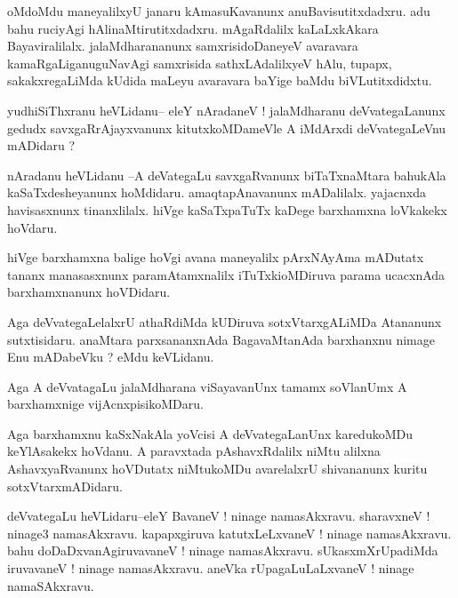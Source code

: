 \documentclass{article}
\begin{document}
\begin{mn}%
oMdoMdu maneyalilxyU janaru kAmasuKavanunx anuBavisutitxdadxru. adu bahu ruciyAgi 
hAlinaMtirutitxdadxru. mAgaRdalilx kaLaLxkAkara Bayaviralilalx. jalaMdharananunx 
samxrisidoDaneyeV avaravara kamaRgaLiganuguNavAgi samxrisida sathxLAdalilxyeV hAlu, tupapx, 
sakakxregaLiMda kUdida maLeyu avaravara baYige baMdu biVLutitxdidxtu.
\end{mn}

 
\begin{mn}%
yudhiSiThxranu heVLidanu-- eleY nAradaneV ! jalaMdharanu deVvategaLanunx gedudx 
savxgaRrAjayxvanunx kitutxkoMDameVle A iMdArxdi deVvategaLeVnu mADidaru ?
\end{mn}

\begin{mn}%
nAradanu heVLidanu --A deVategaLu savxgaRvanunx biTaTxnaMtara bahukAla kaSaTxdesheyanunx 
hoMdidaru. amaqtapAnavanunx mADalilalx. yajacnxda havisasxnunx tinanxlilalx. hiVge 
kaSaTxpaTuTx kaDege barxhamxna loVkakekx hoVdaru.
\end{mn}

\begin{mn}%
hiVge barxhamxna balige hoVgi avana maneyalilx pArxNAyAma mADutatx tananx manasasxnunx 
paramAtamxnalilx iTuTxkioMDiruva parama ucacxnAda barxhamxnanunx hoVDidaru.
\end{mn}

\begin{mn}%
Aga deVvategaLelalxrU athaRdiMda kUDiruva sotxVtarxgALiMDa Atananunx sutxtisidaru. anaMtara 
parxsananxnAda BagavaMtanAda barxhanxnu nimage Enu mADabeVku ? eMdu keVLidanu.
\end{mn}

\begin{mn}%
Aga A deVvatagaLu jalaMdharana viSayavanUnx tamamx soVlanUmx A barxhamxnige vijAcnxpisikoMDaru.
\end{mn}

\begin{mn}%
Aga barxhamxnu kaSxNakAla yoVcisi A deVvategaLanUnx karedukoMDu keYlAsakekx hoVdanu. A 
paravxtada pAshavxRdalilx niMtu alilxna AshavxyaRvanunx hoVDutatx niMtukoMDu avarelalxrU 
shivananunx kuritu sotxVtarxmADidaru. 
\end{mn}

\begin{mn}%
deVvategaLu heVLidaru--eleY BavaneV ! ninage namasAkxravu. sharavxneV ! ninage3 
namasAkxravu. kapapxgiruva katutxLeLxvaneV ! ninage namasAkxravu. bahu 
doDaDxvanAgiruvavaneV ! ninage namasAkxravu. sUkasxmXrUpadiMda iruvavaneV ! ninage 
namasAkxravu. aneVka rUpagaLuLaLxvaneV ! ninage namaSAkxravu.
\end{mn}
\end{document}
